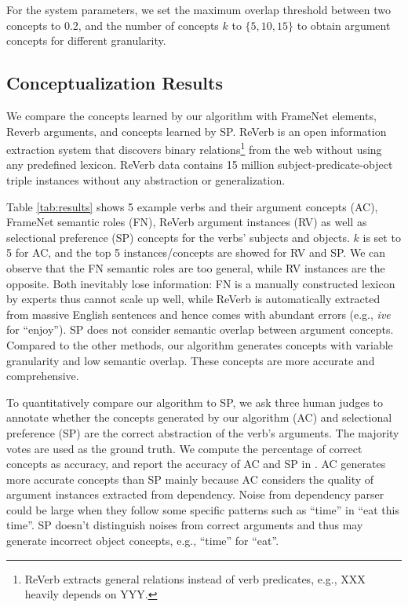 For the system parameters, we set the maximum overlap
threshold between two concepts to 0.2, and the number of concepts
$k$ to $\{5, 10, 15\}$ to obtain argument concepts for
different granularity.


\subsection{Conceptualization Results}
We compare the concepts learned by our algorithm with FrameNet elements, Reverb
arguments, and concepts learned by SP.
ReVerb is an open information extraction system
that discovers binary relations\footnote{ReVerb extracts general relations 
instead of verb predicates, e.g., XXX heavily depends on YYY.} from the web
without using any predefined lexicon. ReVerb data contains
15 million subject-predicate-object triple instances without
any abstraction or generalization.

Table \ref{tab:results} shows 5 example verbs and their argument concepts (AC),
FrameNet semantic roles (FN), ReVerb argument instances (RV) as well as
selectional preference (SP) concepts for the verbs' subjects and objects.
$k$ is set to 5 for AC, and the top 5 instances/concepts are showed for
RV and SP.
We can observe that the FN semantic roles are too general, while RV instances
are the opposite. Both inevitably lose information:
FN is a manually constructed lexicon by experts thus
cannot scale up well, while ReVerb is automatically extracted from massive
English sentences and hence comes with abundant errors (e.g., {\em ive} for
``enjoy''). SP does not consider semantic overlap between argument concepts.
Compared to the other methods, our algorithm generates concepts with
variable granularity and low semantic overlap. These concepts are
more accurate and comprehensive.

To quantitatively compare our algorithm to SP, we ask three human judges to
annotate whether the concepts generated by our algorithm (AC) and
selectional preference (SP) are the correct abstraction of the verb's
arguments.
The majority votes are used as the ground truth. We compute the percentage of
correct concepts as accuracy, and report the accuracy of AC and SP in .
AC generates more accurate concepts than SP mainly because AC
considers the quality of argument instances extracted from dependency.
Noise from dependency parser could be large when they follow
some specific patterns such as ``time'' in ``eat this time''. SP doesn't
distinguish noises from correct arguments and thus may generate
incorrect object concepts, e.g., ``time'' for ``eat''.

